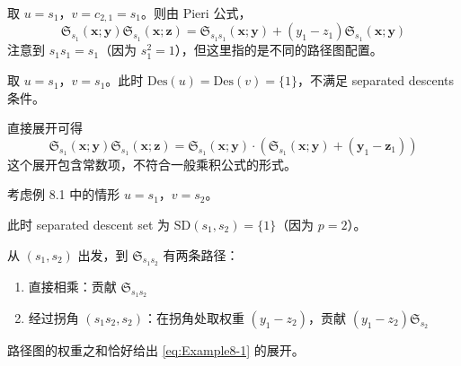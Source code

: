 \begin{Example}
取 $u = s_1$，$v = c_{2,1} = s_1$。则由 Pieri 公式，
\begin{equation}
\mathfrak{S}_{s_1}(\mathbf{x}; \mathbf{y}) \mathfrak{S}_{s_1}(\mathbf{x}; \mathbf{z}) = \mathfrak{S}_{s_1s_1}(\mathbf{x}; \mathbf{y}) + (y_1 - z_1) \mathfrak{S}_{s_1}(\mathbf{x}; \mathbf{y})
\label{eq:Example8-2}
\end{equation}
注意到 $s_1s_1 = s_1$（因为 $s_1^2 = 1$），但这里指的是不同的路径图配置。
\end{Example}

\begin{Example}
取 $u = s_1$，$v = s_1$。此时 $\mathrm{Des}(u) = \mathrm{Des}(v) = \{1\}$，不满足 separated descents 条件。

直接展开可得
\begin{equation}
\mathfrak{S}_{s_1}(\mathbf{x}; \mathbf{y}) \mathfrak{S}_{s_1}(\mathbf{x}; \mathbf{z}) = \mathfrak{S}_{s_1}(\mathbf{x}; \mathbf{y}) \cdot (\mathfrak{S}_{s_1}(\mathbf{x}; \mathbf{y}) + (\mathbf{y}_1 - \mathbf{z}_1))
\label{eq:Example8-3}
\end{equation}
这个展开包含常数项，不符合一般乘积公式的形式。
\end{Example}

\begin{Example}[例 8.4：路径图解释]
考虑例 8.1 中的情形 $u = s_1$，$v = s_2$。

此时 separated descent set 为 $\mathrm{SD}(s_1, s_2) = \{1\}$（因为 $p=2$）。

从 $(s_1, s_2)$ 出发，到 $\mathfrak{S}_{s_1s_2}$ 有两条路径：
\begin{enumerate}
\item 直接相乘：贡献 $\mathfrak{S}_{s_1s_2}$
\item 经过拐角 $(s_1s_2, s_2)$：在拐角处取权重 $(y_1 - z_2)$，贡献 $(y_1 - z_2) \mathfrak{S}_{s_2}$
\end{enumerate}

路径图的权重之和恰好给出 \eqref{eq:Example8-1} 的展开。
\end{Example}


